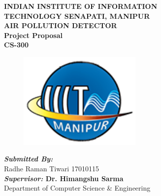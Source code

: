 \documentclass[11pt,openany]{book}
\begin{document}
\frontmatter

\begin{titlepage}



\begin{center}
{\LARGE \bfseries INDIAN INSTITUTE OF INFORMATION}\\[0.4cm]
{\LARGE \bfseries TECHNOLOGY SENAPATI, MANIPUR}\\[1.2cm]
\Huge {\bfseries AIR POLLUTION DETECTOR}\\[0.2cm]
\LARGE {\bfseries Project Proposal}\\
\LARGE {\bfseries CS-300}\\[1.5cm]
\begin{figure}[h!]
	\centering
	\includegraphics[width=6cm]{images/iiitm-logo.png}
\end{figure}

{\Large \emph{\bfseries Submitted By:}}\\[0.5cm]
{\Large Radhe Raman Tiwari  17010115}\\[1cm]
{\Large \bfseries \emph{Supervisor:} Dr. Himangshu Sarma}\\[1cm] 

Department of Computer Science  \& Engineering\\[2cm]
\end{center}

\end{titlepage}



\tableofcontents



\mainmatter




\end{document}
